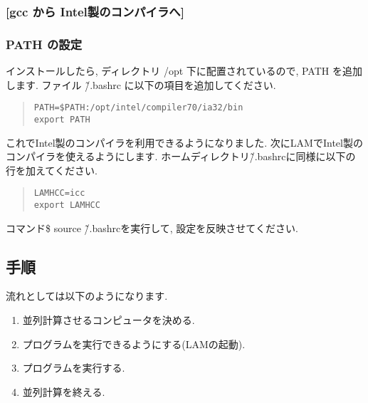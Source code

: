 \documentclass[a4paper,titlepage]{jreport}
\begin{document}
\subsubsection{[gcc から Intel製のコンパイラへ]}

\subsubsection{PATH の設定}

          インストールしたら, ディレクトリ /opt 下に配置されているので, PATH
          を追加します. ファイル \~/.bashrc に以下の項目を追加してください.

\begin{quote}
\begin{screen}
\begin{verbatim}
PATH=$PATH:/opt/intel/compiler70/ia32/bin
export PATH
\end{verbatim}
\end{screen}
\end{quote}

          これでIntel製のコンパイラを利用できるようになりました.
          次にLAMでIntel製のコンパイラを使えるようにします. 
          ホームディレクトリ\~/.bashrcに同様に以下の行を加えてください.
\begin{quote}
\begin{screen}
\begin{verbatim}
LAMHCC=icc
export LAMHCC
\end{verbatim}
\end{screen}
\end{quote}
コマンド\$ source \~/.bashrcを実行して, 設定を反映させてください.

\subsection{手順}

流れとしては以下のようになります.

\begin{enumerate}
\item 並列計算させるコンピュータを決める.

\item プログラムを実行できるようにする(LAMの起動).

\item プログラムを実行する.

\item 並列計算を終える.

\end{enumerate}
\end{document}
